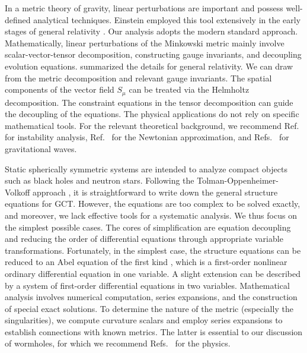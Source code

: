 \documentclass[aps,prd,twocolumn]{revtex4-2}
\begin{document}
In a metric theory of gravity, linear perturbations are important and possess well-defined analytical techniques. Einstein employed this tool extensively in the early stages of general relativity \cite{Einstein1916.NotEngJ.354.769,Einstein1916.NotEngJ.NotEngJ.688}. Our analysis adopts the modern standard approach. Mathematically, linear perturbations of the Minkowski metric mainly involve scalar-vector-tensor decomposition, constructing gauge invariants, and decoupling evolution equations. \citet{Flanagan2005.NewJPhys.7.204} summarized the details for general relativity. We can draw from the metric decomposition and relevant gauge invariants. The spatial components of the vector field $S_\mu$ can be treated via the Helmholtz decomposition. The constraint equations in the tensor decomposition can guide the decoupling of the equations. The physical applications do not rely on specific mathematical tools. For the relevant theoretical background, we recommend Ref.~\cite{Delhom.arXiv.2207.13431} for instability analysis, Ref.~\cite{Bertschinger2011.PhilTransRSocA.369.4947} for the Newtonian approximation, and Refs.~\cite{Eardley1973.PRD.8.3308,Eardley1973.PRL.30.884} for gravitational waves. 

Static spherically symmetric systems are intended to analyze compact objects such as black holes and neutron stars. Following the Tolman-Oppenheimer-Volkoff approach \cite{Tolman1939.PhysRev.55.364,Oppenheimer1939.PhysRev.55.374}, it is straightforward to write down the general structure equations for GCT. However, the equations are too complex to be solved exactly, and moreover, we lack effective tools for a systematic analysis. We thus focus on the simplest possible cases. The cores of simplification are equation decoupling and reducing the order of differential equations through appropriate variable transformations. Fortunately, in the simplest case, the structure equations can be reduced to an Abel equation of the first kind \cite{Polyanin2018.book}, which is a first-order nonlinear ordinary differential equation in one variable. A slight extension can be described by a system of first-order differential equations in two variables. Mathematical analysis involves numerical computation, series expansions, and the construction of special exact solutions. To determine the nature of the metric (especially the singularities), we compute curvature scalars and employ series expansions to establish connections with known metrics. The latter is essential to our discussion of wormholes, for which we recommend Refs.~\cite{Ellis1973.JMathPhysNY.14.104,*Ellis1974,Morris1988.AmJPhys.56.395} for the physics.
\end{document}
